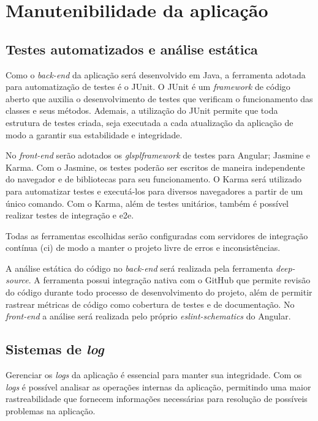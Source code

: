 \documentclass[
    12pt,               %
    openright,          %
    oneside,
    a4paper,            %
    paginasA3,  %
    english,            %
    brazil              %
    ]{ifsp-spo-inf-ctds} %
\begin{document}
\chapter{Manutenibilidade da aplicação}

\section{Testes automatizados e análise estática}


Como o \textit{\gls{back-end}} da aplicação será desenvolvido em Java, a ferramenta adotada para automatização de testes é o JUnit. O JUnit é um \textit{\gls{framework}} de código aberto que auxilia o desenvolvimento de testes que verificam o funcionamento das classes e seus métodos. Ademais, a utilização do JUnit permite que toda estrutura de testes criada, seja executada a cada atualização da aplicação  de modo a garantir sua estabilidade e integridade.


No \textit{\gls{front-end}} serão adotados os \textit{glspl{framework}} de testes para Angular; Jasmine e Karma. Com o Jasmine, os testes poderão ser escritos de maneira independente do navegador e de bibliotecas para seu funcionamento. O Karma será utilizado para automatizar testes e executá-los para diversos navegadores a partir de um único comando. Com o Karma, além de testes unitários, também é possível realizar testes de integração e \ac{e2e}.


Todas as ferramentas escolhidas serão configuradas com servidores de integração contínua (\ac{ci}) de modo a manter o projeto livre de erros e inconsistências.


A análise estática do código no \textit{\gls{back-end}} será realizada pela ferramenta \textit{\gls{deep-source}}. A ferramenta possui integração nativa com o GitHub que permite revisão do código durante todo processo de desenvolvimento do projeto, além de permitir rastrear métricas de código como cobertura de testes e de documentação. No \textit{front-end} a análise será realizada pelo próprio \textit{\gls{eslint-schematics}} do Angular.


\section{Sistemas de \textit{log}}
Gerenciar os \textit{\glspl{log}} da aplicação é essencial para manter sua integridade. Com os \textit{\glspl{log}} é possível analisar as operações internas da aplicação, permitindo uma maior rastreabilidade que fornecem informações necessárias para resolução de possíveis problemas na aplicação.
\end{document}
